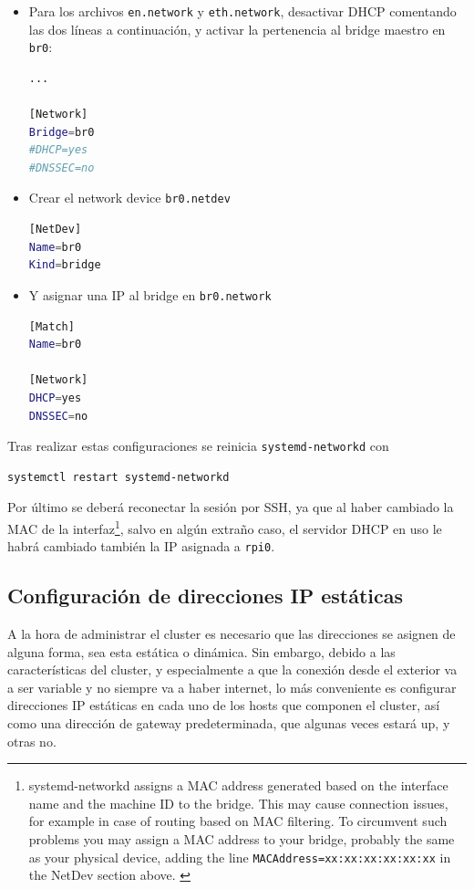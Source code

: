 \begin{itemize}
    \item Para los archivos \texttt{en.network} y \texttt{eth.network}, desactivar DHCP comentando las dos líneas a continuación, y activar la pertenencia al bridge maestro en \texttt{br0}:
\begin{lstlisting}[language=bash]
...

[Network]
Bridge=br0
#DHCP=yes
#DNSSEC=no
\end{lstlisting}
    \item Crear el network device \texttt{br0.netdev}
\begin{lstlisting}[language=bash]
[NetDev]
Name=br0
Kind=bridge
\end{lstlisting}
    \item Y asignar una IP al bridge en \texttt{br0.network}
\begin{lstlisting}[language=bash]
[Match]
Name=br0

[Network]
DHCP=yes
DNSSEC=no
\end{lstlisting}
\end{itemize}

Tras realizar estas configuraciones se reinicia \texttt{systemd-networkd} con
\begin{lstlisting}[language=bash]
systemctl restart systemd-networkd
\end{lstlisting}

Por último se deberá reconectar la sesión por SSH, ya que al haber cambiado la MAC de la interfaz\footnote{systemd-networkd assigns a MAC address generated based on the interface name and the machine ID to the bridge. This may cause connection issues, for example in case of routing based on MAC filtering. To circumvent such problems you may assign a MAC address to your bridge, probably the same as your physical device, adding the line \texttt{MACAddress=xx:xx:xx:xx:xx:xx} in the NetDev section above. \cite{archwiki_systemd-networkd}}, salvo en algún extraño caso, el servidor DHCP en uso le habrá cambiado también la IP asignada a \texttt{rpi0}.

\subsection{Configuración de direcciones IP estáticas}
\label{ssec:configuracion_ip_estaticas}
A la hora de administrar el cluster es necesario que las direcciones se asignen de alguna forma, sea esta estática o dinámica. Sin embargo, debido a las características del cluster, y especialmente a que la conexión desde el exterior va a ser variable y no siempre va a haber internet, lo más conveniente es configurar direcciones IP estáticas en cada uno de los hosts que componen el cluster, así como una dirección de gateway predeterminada, que algunas veces estará up, y otras no.

